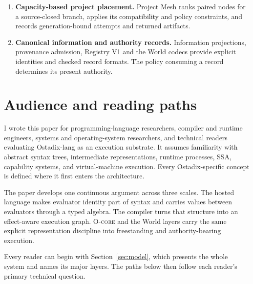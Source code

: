 \documentclass[11pt,oneside]{article}
\newcommand{\ocore}{{\mdseries\textsc{O-core}}}
\begin{document}
\begin{claimbox}
\begin{enumerate}
        the ordinary coordinator.
  \item \textbf{Capacity-based project placement.} Project Mesh ranks paired
        nodes for a source-closed branch, applies its compatibility and policy
        constraints, and records generation-bound attempts and returned
        artifacts.
  \item \textbf{Canonical information and authority records.} Information
        projections, provenance admission, Registry V1 and the World codecs
        provide explicit identities and checked record formats. The policy
        consuming a record determines its present authority.
\end{enumerate}
\end{claimbox}

\section*{Audience and reading paths}

I wrote this paper for programming-language researchers, compiler and runtime
engineers, systems and operating-system researchers, and technical readers
evaluating Ostadix-lang as an execution substrate. It assumes familiarity with
abstract syntax trees, intermediate representations, runtime processes, SSA,
capability systems, and virtual-machine execution. Every Ostadix-specific
concept is defined where it first enters the architecture.

The paper develops one continuous argument across three scales. The hosted
language makes evaluator identity part of syntax and carries values between
evaluators through a typed algebra. The compiler turns that structure into an
effect-aware execution graph. \ocore{} and the World layers carry the same
explicit representation discipline into freestanding and authority-bearing
execution.

Every reader can begin with Section~\ref{sec:model}, which presents the whole
system and names its major layers. The paths below then follow each reader's
primary technical question.
\end{document}

